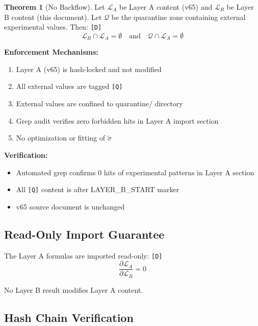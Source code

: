 \documentclass[11pt,a4paper]{article}
\newcommand{\tagD}{\textcolor{green!50!black}{\texttt{[D]}}}
\newcommand{\tagQ}{\textcolor{red!70!black}{\texttt{[Q]}}}
\theoremstyle{definition}
\newtheorem{theorem}{Theorem}[section]
\begin{document}
\begin{nobackflowbox}
\begin{theorem}[No Backflow]
\label{thm:no-backflow}
Let $\mathcal{L}_A$ be Layer A content (v65) and $\mathcal{L}_B$ be Layer B content (this document).
Let $\mathcal{Q}$ be the quarantine zone containing external experimental values.
Then: \tagD{}
\begin{equation}
\label{eq:no-backflow-set}
\boxed{\mathcal{L}_B \cap \mathcal{L}_A = \emptyset \quad \text{and} \quad \mathcal{Q} \cap \mathcal{L}_A = \emptyset}
\end{equation}
\end{theorem}

\textbf{Enforcement Mechanisms:}
\begin{enumerate}
  \item Layer A (v65) is hash-locked and not modified
  \item All external values are tagged \tagQ{}
  \item External values are confined to quarantine/ directory
  \item Grep audit verifies zero forbidden hits in Layer A import section
  \item No optimization or fitting of $\tilde{\sigma}$
\end{enumerate}

\textbf{Verification:}
\begin{itemize}
  \item Automated grep confirms 0 hits of experimental patterns in Layer A section
  \item All \tagQ{} content is after LAYER\_B\_START marker
  \item v65 source document is unchanged
\end{itemize}
\end{nobackflowbox}

\subsection{Read-Only Import Guarantee}
\label{subsec:read-only}

The Layer A formulas are imported read-only: \tagD{}
\begin{equation}
\label{eq:read-only}
\frac{\partial \mathcal{L}_A}{\partial \mathcal{L}_B} = 0
\end{equation}

No Layer B result modifies Layer A content.

\subsection{Hash Chain Verification}
\label{subsec:hash-verify}
\end{document}
